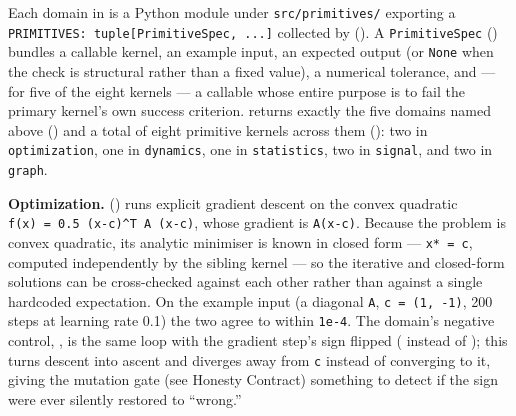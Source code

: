 \documentclass[
]{article}
\begin{document}
Each domain in
is a Python module under \texttt{src/primitives/} exporting a
\texttt{PRIMITIVES:\ tuple{[}PrimitiveSpec,\ ...{]}} collected by
(). A \texttt{PrimitiveSpec}
() bundles a callable kernel, an example
input, an expected output (or \texttt{None} when the check is structural
rather than a fixed value), a numerical tolerance, and --- for five of
the eight kernels --- a  callable whose entire
purpose is to fail the primary kernel's own success criterion.
 returns exactly the five domains named
above () and a
total of eight primitive kernels across them
(): two in \texttt{optimization},
one in \texttt{dynamics}, one in \texttt{statistics}, two in
\texttt{signal}, and two in \texttt{graph}.

\textbf{Optimization.} 
() runs explicit gradient descent
on the convex quadratic \texttt{f(x)\ =\ 0.5\ (x-c)\^{}T\ A\ (x-c)},
whose gradient is \texttt{A(x-c)}. Because the problem is convex
quadratic, its analytic minimiser is known in closed form ---
\texttt{x*\ =\ c}, computed independently by the sibling kernel
 --- so the iterative and closed-form
solutions can be cross-checked against each other rather than against a
single hardcoded expectation. On the example input (a diagonal
\texttt{A}, \texttt{c\ =\ (1,\ -1)}, 200 steps at learning rate 0.1) the
two agree to within \texttt{1e-4}. The domain's negative control,
, is the same loop with the
gradient step's sign flipped ( instead
of ); this turns descent into ascent and
diverges away from \texttt{c} instead of converging to it, giving the
mutation gate (see Honesty Contract) something to detect if the sign
were ever silently restored to ``wrong.''
\end{document}
